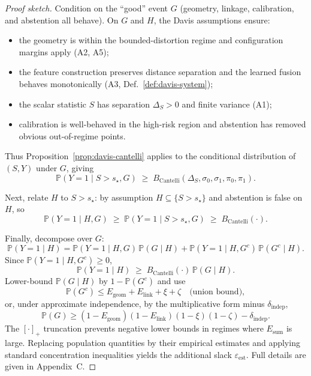 \documentclass[11pt]{article}
\newcommand{\Prob}{\mathbb{P}}
\begin{document}
\begin{proof}[Proof sketch]
Condition on the “good” event $G$ (geometry, linkage, calibration, and abstention all behave).
On $G$ and $H$, the Davis assumptions ensure:
\begin{itemize}[leftmargin=2em]
  \item the geometry is within the bounded-distortion regime and configuration margins apply
    (A2, A5);
  \item the feature construction preserves distance separation and the learned fusion behaves
    monotonically (A3, Def.~\ref{def:davis-system});
  \item the scalar statistic $S$ has separation $\Delta_S>0$ and finite variance (A1);
  \item calibration is well-behaved in the high-risk region and abstention has removed obvious
    out-of-regime points.
\end{itemize}
Thus Proposition~\ref{prop:davis-cantelli} applies to the conditional distribution of
$(S,Y)$ under $G$, giving
\[
\Prob(Y=1 \mid S>s_\star, G) \;\ge\; B_{\mathrm{Cantelli}}(\Delta_S,\sigma_0,\sigma_1,\pi_0,\pi_1).
\]

Next, relate $H$ to $S>s_\star$: by assumption $H \subseteq \{S>s_\star\}$ and abstention is
false on $H$, so
\[
\Prob(Y=1 \mid H, G)
\;\ge\;
\Prob(Y=1 \mid S>s_\star, G)
\;\ge\;
B_{\mathrm{Cantelli}}(\cdot).
\]

Finally, decompose over $G$:
\[
\Prob(Y=1 \mid H)
=
\Prob(Y=1 \mid H, G)\,\Prob(G \mid H)
+
\Prob(Y=1 \mid H, G^c)\,\Prob(G^c \mid H).
\]
Since $\Prob(Y=1 \mid H, G^c) \ge 0$,
\[
\Prob(Y=1 \mid H)
\;\ge\;
B_{\mathrm{Cantelli}}(\cdot)\,\Prob(G \mid H).
\]
Lower-bound $\Prob(G \mid H)$ by $1 - \Prob(G^c)$ and use
\[
\Prob(G^c) \le E_{\mathrm{geom}} + E_{\mathrm{link}} + \xi + \zeta
\quad\text{(union bound)},
\]
or, under approximate independence, by the multiplicative form minus $\delta_{\mathrm{indep}}$,
\[
\Prob(G) \ge (1-E_{\mathrm{geom}})(1-E_{\mathrm{link}})(1-\xi)(1-\zeta) - \delta_{\mathrm{indep}}.
\]
The $[\cdot]_+$ truncation prevents negative lower bounds in regimes where $E_{\mathrm{sum}}$
is large. Replacing population quantities by their empirical estimates and applying standard
concentration inequalities yields the additional slack $\varepsilon_{\mathrm{est}}$. Full details are
given in Appendix~C.
\end{proof}
\end{document}
